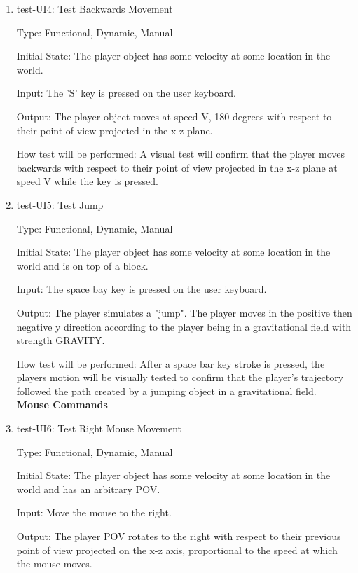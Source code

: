 \documentclass[12pt, titlepage]{article}
\begin{document}
\begin{enumerate}
\item{test-UI4: Test Backwards Movement\\}

Type: Functional, Dynamic, Manual
					
Initial State: The player object has some velocity at some location in the world.
					
Input: The 'S' key is pressed on the user keyboard.
					
Output: The player object moves at speed V, 180 degrees with respect to their point of view projected in the x-z plane.
					
How test will be performed: A visual test will confirm that the player moves backwards with respect to their point of view projected in the x-z plane at speed V while the key is pressed.

\item{test-UI5: Test Jump\\}

Type: Functional, Dynamic, Manual
					
Initial State: The player object has some velocity at some location in the world and is on top of a block.
					
Input: The space bay key is pressed on the user keyboard.
					
Output: The player simulates a "jump". The player moves in the positive then negative y direction according to the player being in a gravitational field with strength GRAVITY. 
					
How test will be performed: After a space bar key stroke is pressed, the players motion will be visually tested to confirm that the player's trajectory followed the path created by a jumping object in a gravitational field.\\


\textbf{Mouse Commands}

\item{test-UI6: Test Right Mouse Movement \\}

Type: Functional, Dynamic, Manual

Initial State: The player object has some velocity at some location in the world and has an arbitrary POV.
					
Input: Move the mouse to the right.
					
Output: The player POV rotates to the right with respect to their previous point of view projected on the x-z axis, proportional to the speed at which the mouse moves.
					

\end{enumerate}
\end{document}

